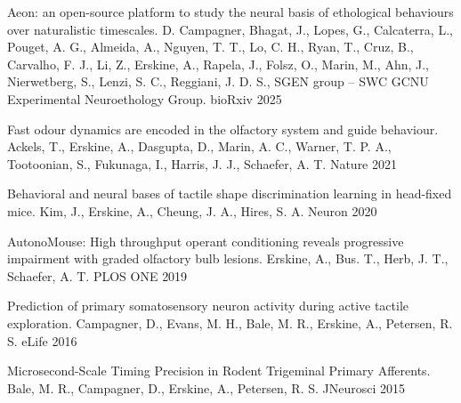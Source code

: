 
\begin{cvhonors}

  \cvhonor
    {Aeon: an open-source platform to study the neural basis of ethological behaviours over naturalistic timescales.} %
    {D. Campagner, Bhagat, J., Lopes, G., Calcaterra, L., Pouget, A. G., Almeida, A., Nguyen, T. T., Lo, C. H., Ryan, T., Cruz, B., Carvalho, F. J., Li, Z., Erskine, A., Rapela, J., Folsz, O., Marin, M., Ahn, J., Nierwetberg, S., Lenzi, S. C., Reggiani, J. D. S., SGEN group – SWC GCNU Experimental Neuroethology Group.} %
    {bioRxiv} %
    {2025} %

  \cvhonor
    {Fast odour dynamics are encoded in the olfactory system and guide behaviour.} %
    {Ackels, T., Erskine, A., Dasgupta, D., Marin, A. C., Warner, T. P. A., Tootoonian, S., Fukunaga, I., Harris, J. J., Schaefer, A. T.} %
    {Nature} %
    {2021} %

  \cvhonor
    {Behavioral and neural bases of tactile shape discrimination learning in head-fixed mice.} %
    {Kim, J., Erskine, A., Cheung, J. A., Hires, S. A.} %
    {Neuron} %
    {2020} %

    \cvhonor
      {AutonoMouse: High throughput operant conditioning reveals progressive impairment with graded olfactory bulb lesions.} %
      {Erskine, A., Bus. T., Herb, J. T., Schaefer, A. T.} %
      {PLOS ONE} %
      {2019} %

  \cvhonor
    {Prediction of primary somatosensory neuron activity during active tactile exploration.} %
    {Campagner, D., Evans, M. H., Bale, M. R., Erskine, A., Petersen, R. S.} %
    {eLife} %
    {2016} %

  \cvhonor
    {Microsecond-Scale Timing Precision in Rodent Trigeminal Primary Afferents.} %
    {Bale, M. R., Campagner, D., Erskine, A., Petersen, R. S.} %
    {JNeurosci} %
    {2015} %

\end{cvhonors}